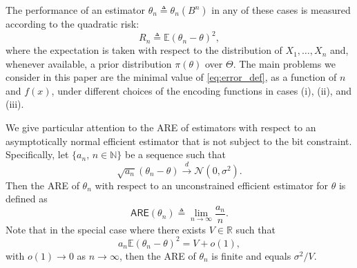 \documentclass[letterpaper, 11pt]{IEEEtran}      %
\newcommand{\ARE}{\mathsf{ARE}}
\newcommand{\Ncal}{\mathcal{N}}
\begin{document}
The performance of an estimator ${\theta}_n \triangleq {\theta}_n(B^n)$ in any of these cases is measured according to the quadratic risk:
\begin{equation}
\label{eq:error_def}
R_n \triangleq \mathbb E\left({\theta}_n - \theta \right)^2,
\end{equation}
where the expectation is taken with respect to the distribution of $X_1,\ldots,X_n$ and, whenever available, a prior distribution $\pi(\theta)$ over $\Theta$.  
%
The main problems we consider in this paper are the minimal value of \eqref{eq:error_def}, as a function of $n$ and $f(x)$, under different choices of the encoding functions in cases (i), (ii), and (iii). \par

We give particular attention to the ARE of estimators with respect to an asymptotically normal efficient estimator that is not subject to the bit constraint. Specifically, let $\{a_n,\,n\in \mathbb N\}$ be a sequence such that 
\[
\sqrt{a_n}\left({\theta}_n - \theta\right) \overset{d}{\longrightarrow} \Ncal(0, \sigma^2).
\]
Then the ARE of ${\theta}_n$ with respect to an unconstrained efficient estimator for $\theta$ is defined as \cite[Def. 6.6.6]{lehmann2006theory}
\[
\ARE({\theta}_n) \triangleq
\lim_{n\rightarrow \infty} \frac{a_n}{n}. 
\]
Note that in the special case where there exists $V \in \mathbb R$ such that
\[
a_n \mathbb E \left({\theta}_n - \theta \right)^2 = V + o(1),
\]
with $o(1)\to 0$ as $n\to \infty$, then the ARE of ${\theta}_n$ is finite and equals $\sigma^2/V$. \par
\end{document}
